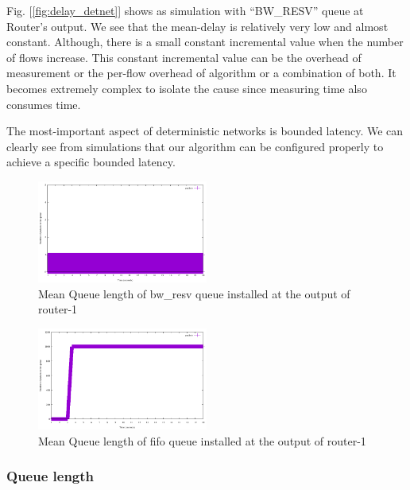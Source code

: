 \documentclass[conference]{IEEEtran}
\begin{document}
Fig. [\ref{fig:delay_detnet}] shows as simulation with ``BW\_RESV'' queue at Router's output. We see that the mean-delay is relatively very low and almost constant. Although, there is a small constant incremental value when the number of flows increase. This constant incremental value can be the overhead of measurement or the per-flow overhead of algorithm or a combination of both. It becomes extremely complex to isolate the cause since measuring time also consumes time. 

The most-important aspect of deterministic networks is bounded latency. We can clearly see from simulations that our algorithm can be configured properly to achieve a specific bounded latency.

\begin{figure}[ht]
	\begin{center}
		\includegraphics[width=0.50\textwidth]{plots/pkt_detnet.pdf}
		\caption{Mean Queue length of bw\_resv queue installed at the output of router-1}\label{fig:pkt_detnet}
	\end{center}
\end{figure}
\begin{figure}[ht]
	\begin{center}
		\includegraphics[width=0.50\textwidth]{plots/pkt_fifo.pdf}
		\caption{Mean Queue length of fifo queue installed at the output of router-1}\label{fig:pkt_fifo}
	\end{center}
\end{figure}

\subsubsection{Queue length}
\end{document}
